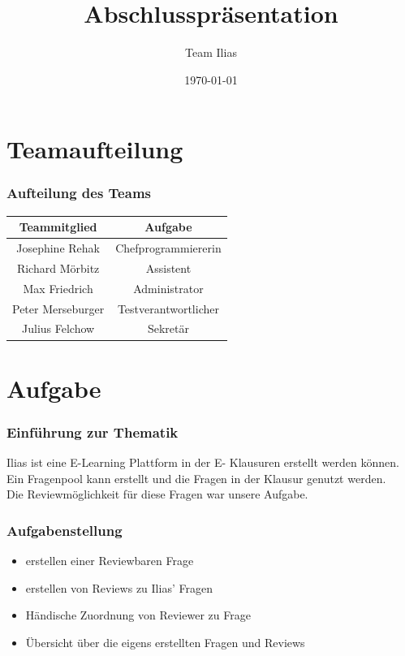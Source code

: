 \documentclass{beamer}
\title{Abschlusspräsentation}
\author{Team Ilias}
\date{\today}
\begin{document}
	\maketitle
	\frame{\tableofcontents[]}

	\section{Teamaufteilung}
	\begin{frame}
		\frametitle{Aufteilung des Teams}
		\begin{tabular}{|c|c|}\hline
			Teammitglied & Aufgabe \\\hline
			Josephine Rehak & Chefprogrammiererin\\\hline
			Richard Mörbitz & Assistent\\\hline
			Max Friedrich & Administrator\\\hline
			Peter Merseburger & Testverantwortlicher\\\hline
			Julius Felchow & Sekretär\\\hline
		\end{tabular}
	\end{frame} 
 
	\section{Aufgabe}
		\begin{frame}
			\frametitle{Einführung zur Thematik}
  			Ilias ist eine E-Learning Plattform in der E-					Klausuren erstellt werden können. Ein Fragenpool 				kann erstellt und die Fragen in der Klausur 					genutzt werden.\\
  			\pause
    		Die Reviewmöglichkeit für diese Fragen war unsere 				Aufgabe.
		\end{frame}
		\begin{frame}
			\frametitle{Aufgabenstellung}
			\begin{itemize}
				\item erstellen einer Reviewbaren Frage
				\item erstellen von Reviews zu Ilias' Fragen
				\item Händische Zuordnung von Reviewer zu Frage
				\item Übersicht über die eigens erstellten Fragen und Reviews
				
			\end{itemize}
		\end{frame}
\end{document}
